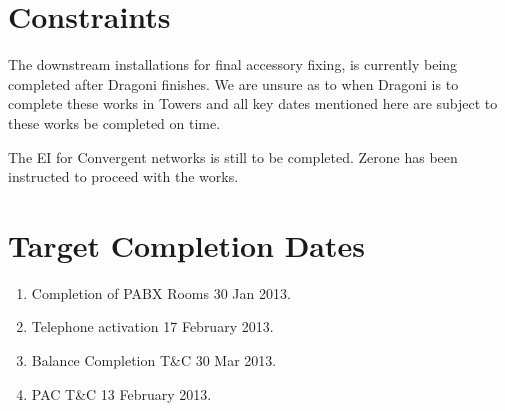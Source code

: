 \section{Constraints}

The downstream installations for final accessory fixing, is currently being completed after Dragoni finishes. We are unsure as to when Dragoni is to complete these works in Towers and all key dates mentioned here are subject to these works be completed on time.

The EI for Convergent networks is still to be completed. Zerone has been instructed to proceed with the works.

\section{Target Completion Dates}

\begin{enumerate}
\item  Completion of PABX Rooms 30 Jan 2013.
\item  Telephone activation 17 February 2013.
\item  Balance Completion T\&C  30 Mar 2013.
\item  PAC T\&C  13 February 2013.          
\end{enumerate}


 








